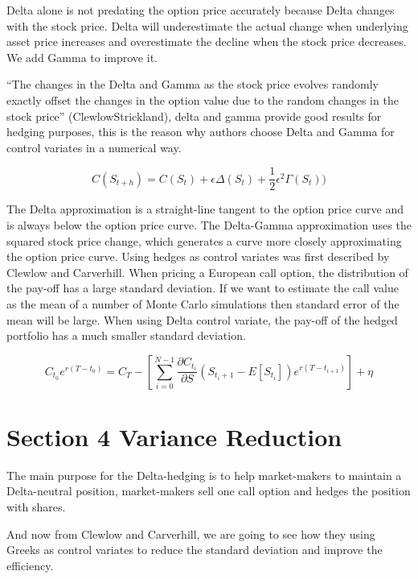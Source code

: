 \documentclass[11pt,]{article}
\begin{document}
Delta alone is not predating the option price accurately because Delta
changes with the stock price. Delta will underestimate the actual change
when underlying asset price increases and overestimate the decline when
the stock price decreases. We add Gamma to improve it.

``The changes in the Delta and Gamma as the stock price evolves randomly
exactly offset the changes in the option value due to the random changes
in the stock price'' (ClewlowStrickland), delta and gamma provide good
results for hedging purposes, this is the reason why authors choose
Delta and Gamma for control variates in a numerical way.

\[
C(S_{t+h} )= C(S_t) + \epsilon \Delta(S_t) + \frac{1}{2}\epsilon^2\Gamma(S_t))
\]

The Delta approximation is a straight-line tangent to the option price
curve and is always below the option price curve. The Delta-Gamma
approximation uses the squared stock price change, which generates a
curve more closely approximating the option price curve. Using hedges as
control variates was first described by Clewlow and Carverhill. When
pricing a European call option, the distribution of the pay-off has a
large standard deviation. If we want to estimate the call value as the
mean of a number of Monte Carlo simulations then standard error of the
mean will be large. When using Delta control variate, the pay-off of the
hedged portfolio has a much smaller standard deviation.

\[
C_{t_0}e^{r(T-t_0)} = C_T - [\sum^{N-1}_{i=0}\frac{\partial C_{t_i}}{\partial S}(S_{t{_i+1}} - E[S_{t_i}])e^{r(T-t_{i+1})}] + \eta
\]

\hypertarget{section-4-variance-reduction}{%
\section{Section 4 Variance
Reduction}\label{section-4-variance-reduction}}

The main purpose for the Delta-hedging is to help market-makers to
maintain a Delta-neutral position, market-makers sell one call option
and hedges the position with shares.

And now from Clewlow and Carverhill, we are going to see how they using
Greeks as control variates to reduce the standard deviation and improve
the efficiency.
\end{document}
